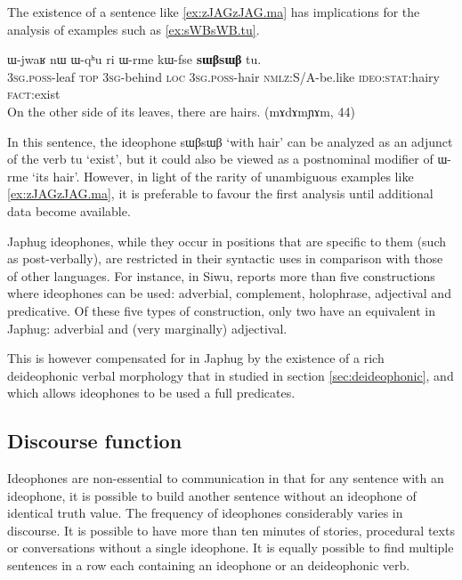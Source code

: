 \documentclass[oldfontcommands,oneside,a4paper,11pt]{article}
\newcommand{\ipa}[1]{{\phon \mbox{#1}}} %
\begin{document}
The existence of a sentence like \ref{ex:zJAGzJAG.ma}  has implications for the analysis of examples such as \ref{ex:sWBsWB.tu}.
    \begin{exe}
\ex \label{ex:sWBsWB.tu}
\gll 
   \ipa{ɯ-jwaʁ} 	\ipa{nɯ} 	\ipa{ɯ-qʰu} 	\ipa{ri} 	\ipa{ɯ-rme} 	\ipa{kɯ-fse} 	\ipa{\textbf{sɯβsɯβ}} 	\ipa{tu.} \\
   \textsc{3sg.poss}-leaf \textsc{top} \textsc{3sg}-behind \textsc{loc}    \textsc{3sg.poss}-hair \textsc{nmlz}:S/A-be.like \textsc{ideo:stat}:hairy \textsc{fact}:exist    \\
\glt On the other side of its leaves, there are hairs. (mɤdɤmɲɤm, 44)
\end{exe}

In this sentence, the ideophone \ipa{sɯβsɯβ}  `with hair' can be analyzed as an adjunct of the verb \ipa{tu} `exist', but it could also be viewed as a postnominal modifier of 	\ipa{ɯ-rme}  `its hair'. However, in light of the rarity of unambiguous examples like \ref{ex:zJAGzJAG.ma}, it is preferable to favour the first analysis until additional data become available.
 


Japhug ideophones, while they occur in positions that are specific to them (such as post-verbally), are  restricted in their syntactic uses in comparison with those of other languages. For instance, in Siwu, \citet{dingemanse14} reports more than five constructions where ideophones can be used: adverbial, complement, holophrase, adjectival and predicative. Of these five types of construction, only two have an equivalent in Japhug: adverbial and (very marginally) adjectival. 

This is however compensated  for in Japhug by the existence of a rich deideophonic verbal morphology that in studied in section \ref{sec:deideophonic}, and which allows ideophones to be used a full predicates.

\subsection{Discourse function}
  Ideophones are  non-essential to communication in that for any sentence with an ideophone, it is possible to build another sentence without an ideophone of identical truth value. The frequency of ideophones considerably varies  in discourse. It is possible to have more than ten minutes of stories, procedural texts or conversations without a single ideophone. It is equally possible to find  multiple sentences in a row each containing an ideophone or an deideophonic verb.
  
\end{document}
